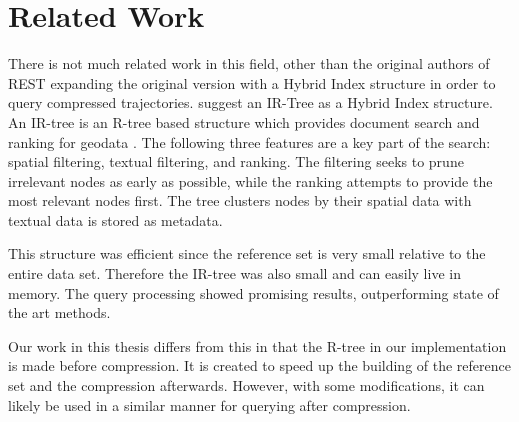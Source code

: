 \chapter{Related Work}
\label{chap:rel}
There is not much related work in this field, other than the original authors of REST expanding the original version with a Hybrid Index structure in order to query compressed trajectories. \textcite{zheng2019reference} suggest an IR-Tree as a Hybrid Index structure. An IR-tree is an R-tree based structure which provides document search and ranking for geodata \cite{li2010ir}. The following three features are a key part of the search: spatial filtering, textual filtering, and ranking. The filtering seeks to prune irrelevant nodes as early as possible, while the ranking attempts to provide the most relevant nodes first. The tree clusters nodes by their spatial data with textual data is stored as metadata.

This structure was efficient since the reference set is very small relative to the entire data set. Therefore the IR-tree was also small and can easily live in memory. The query processing showed promising results, outperforming state of the art methods.

Our work in this thesis differs from this in that the R-tree in our implementation is made before compression. It is created to speed up the building of the reference set and the compression afterwards. However, with some modifications, it can likely be used in a similar manner for querying after compression.